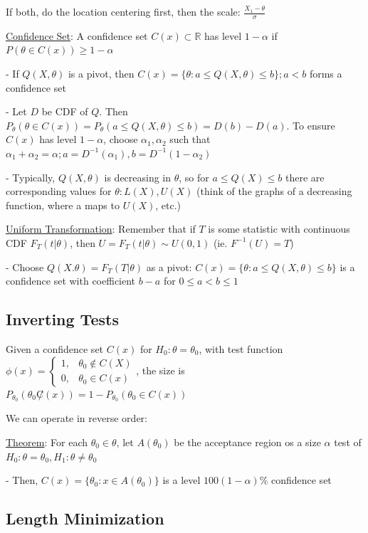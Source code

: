 \documentclass{article}
\newcommand{\real}{\mathbb{R}} %
\begin{document}
If both, do the location centering first, then the scale: $\frac{X_1 - \theta}{\sigma}$

\underline{Confidence Set}: A confidence set $C(x) \subset \real$ has level $1-\alpha$ if $P(\theta \in C(x)) \ge 1-\alpha$

- If $Q(X,\theta)$ is a pivot, then $C(x) = \{\theta: a \le Q(X, \theta) \le b\}; a<b$ forms a confidence set

- Let $D$ be CDF of $Q$. Then $P_{\theta}(\theta \in C(x)) = P_{\theta}(a \le Q(X,\theta) \le b) = D(b) - D(a)$. To ensure $C(x)$ has level $1-\alpha$, choose $\alpha_1, \alpha_2$ such that $\alpha_1 + \alpha_2 = \alpha; a = D^{-1}(\alpha_1), b = D^{-1}(1-\alpha_2)$

- Typically, $Q(X,\theta)$ is decreasing in $\theta$, so for $a \le Q(X) \le b$ there are corresponding values for $\theta: L(X), U(X)$ (think of the graphs of a decreasing function, where a maps to $U(X)$, etc.)

\underline{Uniform Transformation}: Remember that if $T$ is some statistic with continuous CDF $F_T(t|\theta)$, then $U = F_T(t|\theta) \sim U(0,1)$ (ie. $F^{-1}(U) = T$)

- Choose $Q(X.\theta) = F_T(T|\theta)$ as a pivot: $C(x) = \{\theta: a \le Q(X,\theta) \le b\}$ is a confidence set with coefficient $b-a$ for $0 \le a < b \le 1$

\subsection{Inverting Tests}

Given a confidence set $C(x)$ for $H_0: \theta = \theta_0$, with test function $\phi(x) = \begin{cases}1, & \theta_0 \notin C(X) \\ 0, & \theta_0 \in C(x) \end{cases}$, the size is $P_{\theta_0}(\theta_0 \not C(x))  = 1 - P_{\theta_0}(\theta_0 \in C(x))$

We can operate in reverse order: 

\underline{Theorem}: For each $\theta_0 \in \theta$, let $A(\theta_0) $ be the acceptance region os a size $\alpha$ test of $H_0: \theta = \theta_0, H_1: \theta \neq \theta_0$

- Then, $C(x) = \{\theta_0: x \in A(\theta_0)\}$ is a level $100(1-\alpha)\%$ confidence set

\subsection{Length Minimization}
\end{document}
